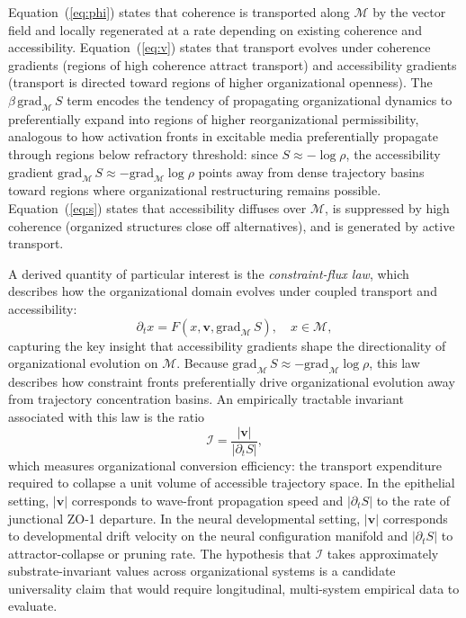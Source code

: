 \documentclass[11pt,a4paper]{article}
\theoremstyle{plain}
\theoremstyle{definition}
\begin{document}
Equation~(\ref{eq:phi}) states that coherence is transported along $\mathcal{M}$ by the
vector field and locally regenerated at a rate depending on existing coherence and
accessibility. Equation~(\ref{eq:v}) states that transport evolves under coherence
gradients (regions of high coherence attract transport) and accessibility gradients
(transport is directed toward regions of higher organizational openness). The
$\beta\,\mathrm{grad}_{\mathcal{M}}\,S$ term encodes the tendency of propagating
organizational dynamics to preferentially expand into regions of higher reorganizational
permissibility, analogous to how activation fronts in excitable media preferentially
propagate through regions below refractory threshold: since $S \approx -\log\rho$,
the accessibility gradient $\mathrm{grad}_{\mathcal{M}}\,S \approx -\mathrm{grad}_{\mathcal{M}}\log\rho$
points away from dense trajectory basins toward regions where organizational
restructuring remains possible. Equation~(\ref{eq:s}) states that accessibility
diffuses over $\mathcal{M}$, is suppressed by high coherence (organized structures close
off alternatives), and is generated by active transport.

A derived quantity of particular interest is the \emph{constraint-flux law}, which
describes how the organizational domain evolves under coupled transport and
accessibility:
\begin{equation}
\partial_t x = F(x, \mathbf{v}, \mathrm{grad}_{\mathcal{M}}\,S), \quad x \in \mathcal{M},
\label{eq:flux}
\end{equation}
capturing the key insight that accessibility gradients shape the directionality of
organizational evolution on $\mathcal{M}$. Because $\mathrm{grad}_{\mathcal{M}}\,S
\approx -\mathrm{grad}_{\mathcal{M}}\log\rho$, this law describes how constraint fronts
preferentially drive organizational evolution away from trajectory concentration basins.
An empirically tractable invariant associated with this law is the ratio
\begin{equation}
\mathcal{I} = \frac{|\mathbf{v}|}{|\partial_t S|},
\label{eq:invariant}
\end{equation}
which measures organizational conversion efficiency: the transport expenditure required
to collapse a unit volume of accessible trajectory space. In the epithelial setting,
$|\mathbf{v}|$ corresponds to wave-front propagation speed and $|\partial_t S|$ to the
rate of junctional ZO-1 departure. In the neural developmental setting, $|\mathbf{v}|$
corresponds to developmental drift velocity on the neural configuration manifold and
$|\partial_t S|$ to attractor-collapse or pruning rate. The hypothesis that
$\mathcal{I}$ takes approximately substrate-invariant values across organizational
systems is a candidate universality claim that would require longitudinal, multi-system
empirical data to evaluate.
\end{document}

